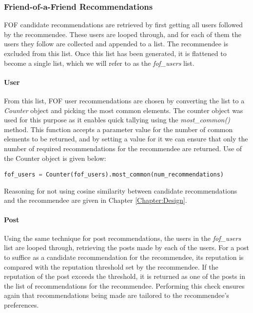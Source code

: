 \subsubsection{Friend-of-a-Friend Recommendations}
FOF candidate recommendations are retrieved by first getting all users followed by the recommendee. These users are looped through, and for each of them the users they follow are collected and appended to a list. The recommendee is excluded from this list. Once this list has been generated, it is flattened to become a single list, which we will refer to as the \textit{fof\_users} list.

\paragraph{User} From this list, FOF user recommendations are chosen by converting the list to a \emph{Counter} object and picking the most common elements. The counter object was used for this purpose as it enables quick tallying \cite{Python:Counter} using the \textit{most\_common()} method. This function accepts a parameter value for the number of common elements to be returned, and by setting a value for it we can ensure that only the number of required recommendations for the recommendee are returned. Use of the Counter object is given below:

\begin{lstlisting}[language=python]
	fof_users = Counter(fof_users).most_common(num_recommendations)
\end{lstlisting}

Reasoning for not using cosine similarity between candidate recommendations and the recommendee are given in Chapter \ref{Chapter:Design}.

\paragraph{Post} Using the same technique for post recommendations, the users in the \textit{fof\_users} list are looped through, retrieving the posts made by each of the  users. For a post to suffice as a candidate recommendation for the recommendee, its reputation is compared with the reputation threshold set by the recommendee. If the reputation of the post exceeds the threshold, it is returned as one of the posts in the list of recommendations for the recommendee. Performing this check ensures again that recommendations being made are tailored to the recommendee's preferences.

